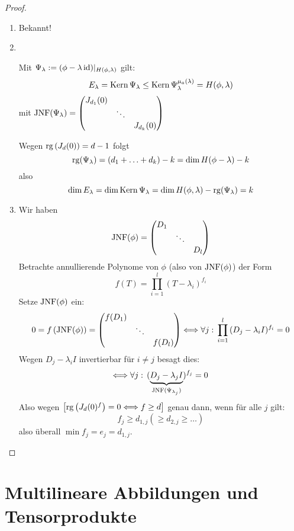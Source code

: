 \documentclass[parskip,a4paper,twoside,DIV15,BCOR12mm]{scrbook}
\begin{document}
\begin{proof}
\begin{enumerate}
\item Bekannt!
\item \ \vspace*{-24pt}
    \begin{remind} %
    Mit \(\Psi_{\lambda}:=(\phi-\lambda\operatorname{id})|_{H(\phi,\lambda)}\) gilt:
    \[
    E_{\lambda}=\operatorname{Kern}\Psi_{\lambda}\leq
	\operatorname{Kern}\Psi_{\lambda}^{\mu_{a}(\lambda)}=H(\phi,\lambda)
    \]
    mit \(\operatorname{JNF}(\Psi_{\lambda})=\begin{pmatrix}
	    J_{d_{1}}(0)&&\\
	    &\ddots&\\
	    &&J_{d_{k}}(0)
	\end{pmatrix}\)
    \end{remind}
Wegen \(\operatorname{rg}\left(J_{d}(0)\right)=d-1\) folgt
\[
\operatorname{rg}(\Psi_{\lambda})=(d_{1}+\ldots+d_{k})-k=\dim H(\phi-\lambda)-k
\]
also
\[
\dim E_{\lambda}=\dim\operatorname{Kern}\Psi_{\lambda}=
    \dim H(\phi,\lambda)-\operatorname{rg}(\Psi_{\lambda})=k
\]
\item Wir haben
\[
\operatorname{JNF}(\phi)=\begin{pmatrix}
	D_{1}&&\\
	&\ddots&\\
	&&D_{l}
    \end{pmatrix}
\]
Betrachte annullierende Polynome von \(\phi\) (also von \(\operatorname{JNF}(\phi)\)) der Form
\[
f(T)=\prod_{i=1}^{l}{(T-\lambda_{i})^{f_{i}}}
\]
Setze \(\operatorname{JNF}(\phi)\) ein:
\[
0=f\left(\operatorname{JNF}(\phi)\right)=\begin{pmatrix}
	f(D_{1})&&\\
	&\ddots&\\
	&&f(D_{l})
    \end{pmatrix}
\Longleftrightarrow\forall j:\,\prod_{i=1}^{l}{(D_{j}-\lambda_{i}I)^{f_{i}}}=0
\]
Wegen \(D_{j}-\lambda_{i}I\) invertierbar für \(i\neq j\) besagt dies:
\[
\Longleftrightarrow\forall j:\,
(\underbrace{D_{j}-\lambda_{j}I}_{\operatorname{JNF}(\Psi_{\lambda_{j}})})^{f_{j}}=0
\]
Also wegen 
\(\left[\operatorname{rg}\left(J_{d}(0)^{f}\right)=0\Longleftrightarrow f\geq d\right]\)
genau dann, wenn für alle \(j\) gilt:
\[
f_{j}\geq d_{1,j}(\geq d_{2,j}\geq\ldots)
\]
also überall \(\min f_{j}=e_{j}=d_{1,j}\).
\end{enumerate}
\end{proof}

\chapter{Multilineare Abbildungen und Tensorprodukte}
\end{document}
